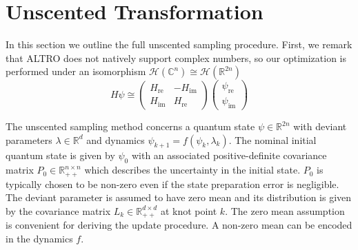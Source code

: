 \section{Unscented Transformation}
\label{appendix:unscented}
In this section we outline the full unscented sampling procedure.
First, we remark that ALTRO does not natively support complex numbers, so our optimization
is performed under an isomorphism $\mathcal{H}(\mathbb{C}^{n}) \cong \mathcal{H}(\mathbb{R}^{2n})$
\cite{leung2017speedup}
\begin{equation}
  H \psi \cong \begin{pmatrix} H_{\textrm{re}} & -H_{\textrm{im}} \\ H_{\textrm{im}} & H_{\textrm{re}}\end{pmatrix}
  \begin{pmatrix} \psi_{\textrm{re}} \\ \psi_{\textrm{im}}\end{pmatrix}
\end{equation}

The unscented sampling method concerns a quantum state $\psi \in \mathbb{R}^{2n}$ with
deviant parameters $\lambda \in \mathbb{R}^{d}$ and dynamics $\psi_{k + 1} = f(\psi_{k}, \lambda_{k})$.
The nominal initial quantum state is given by $\psi_{0}$ with an associated
positive-definite covariance matrix $P_{0} \in \mathbb{R}_{++}^{n \times n}$
which describes the uncertainty in the initial state.
$P_{0}$ is typically chosen to be non-zero even if the state preparation error is negligible.
The deviant parameter
is assumed to have zero mean and its distribution is given by the covariance matrix
$L_{k} \in \mathbb{R}_{++}^{d \times d}$ at knot point $k$. The zero mean assumption
is convenient for deriving the update procedure. A non-zero mean can be encoded
in the dynamics $f$.

